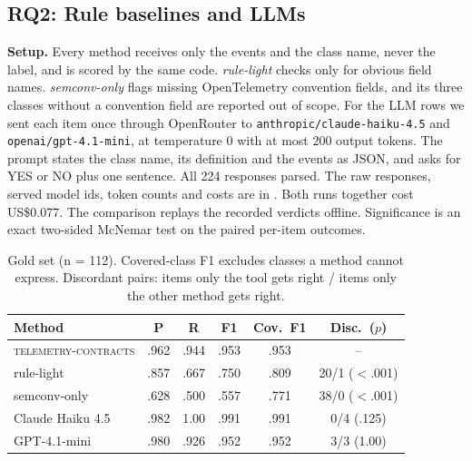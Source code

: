 \documentclass[conference]{IEEEtran}
\newcommand{\tool}{\textsc{telemetry-contracts}\xspace}
\begin{document}
\subsection{RQ2: Rule baselines and LLMs}

\textbf{Setup.} Every method receives only the events and the class name, never the label, and is scored by the same code. \emph{rule-light} checks only for obvious field names. \emph{semconv-only} flags missing OpenTelemetry convention fields, and its three classes without a convention field are reported out of scope. For the LLM rows we sent each item once through OpenRouter to \texttt{anthropic/claude-haiku-4.5} and \texttt{openai/gpt-4.1-mini}, at temperature 0 with at most 200 output tokens. The prompt states the class name, its definition and the events as JSON, and asks for YES or NO plus one sentence. All 224 responses parsed. The raw responses, served model ids, token counts and costs are in . Both runs together cost US\$0.077. The comparison replays the recorded verdicts offline. Significance is an exact two-sided McNemar test on the paired per-item outcomes.

\begin{table}[t]
\caption{Gold set (n = 112). Covered-class F1 excludes classes a method cannot express. Discordant pairs: items only the tool gets right / items only the other method gets right.}
\label{tab:rq2}
\centering
\footnotesize\setlength{\tabcolsep}{3pt}
\begin{tabular}{lccccc}
\toprule
Method & P & R & F1 & Cov.\ F1 & Disc.\ ($p$) \\
\midrule
\tool & .962 & .944 & .953 & .953 & -- \\
rule-light & .857 & .667 & .750 & .809 & 20/1 ($<$.001) \\
semconv-only & .628 & .500 & .557 & .771 & 38/0 ($<$.001) \\
Claude Haiku 4.5 & .982 & 1.00 & .991 & .991 & 0/4 (.125) \\
GPT-4.1-mini & .980 & .926 & .952 & .952 & 3/3 (1.00) \\
\bottomrule
\end{tabular}
\end{table}
\end{document}
